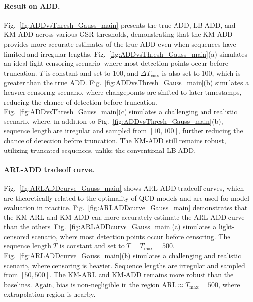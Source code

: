 \documentclass{article}
\theoremstyle{plain}
\theoremstyle{definition}
\theoremstyle{remark}
\begin{document}
\paragraph{Result on ADD.}
Fig.~\ref{fig:ADDvsThresh_Gauss_main} presents the true ADD, LB-ADD, and KM-ADD across various GSR thresholds, demonstrating that the KM-ADD provides more accurate estimates of the true ADD even when sequences have limited and irregular lengths.
Fig.~\ref{fig:ADDvsThresh_Gauss_main}(a) simulates an ideal light-censoring scenario, where most detection points occur before truncation. 
$T$ is constant and set to $100$, and $\Delta T_\mathrm{max}$ is also set to $100$, which is greater than the true ADD.
Fig.~\ref{fig:ADDvsThresh_Gauss_main}(b) simulates a heavier-censoring scenario, where changepoints are shifted to later timestamps, reducing the chance of detection before truncation.
Fig.~\ref{fig:ADDvsThresh_Gauss_main}(c) simulates a challenging and realistic scenario, where, in addition to Fig.~\ref{fig:ADDvsThresh_Gauss_main}(b), sequence length are irregular and sampled from $[10, 100]$, further reducing the chance of detection before truncation.
The KM-ADD still remains robust, utilizing truncated sequences, unlike the conventional LB-ADD.


\paragraph{ARL-ADD tradeoff curve.}
Fig.~\ref{fig:ARLADDcurve_Gauss_main} shows ARL-ADD tradeoff curves, which are theoretically related to the optimality of QCD models and are used for model evaluation in practice. 
Fig.~\ref{fig:ARLADDcurve_Gauss_main} demonstrates that the KM-ARL and KM-ADD can more accurately estimate the ARL-ADD curve than the others.
Fig.~\ref{fig:ARLADDcurve_Gauss_main}(a) simulates a light-censored scenario, where most detection points occur before censoring. The sequence length $T$ is constant and set to $T = T_\mathrm{max} = 500$.
Fig.~\ref{fig:ARLADDcurve_Gauss_main}(b) simulates a challenging and realistic scenario, where censoring is heavier. Sequence lengths are irregular and sampled from $[50, 500]$.
The KM-ARL and KM-ADD remains more robust than the baselines.
Again, bias is non-negligible in the region $\mathrm{ARL} \approx T_\mathrm{max} = 500$, where extrapolation region is nearby.







\end{document}
